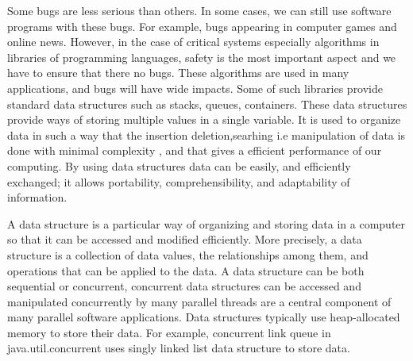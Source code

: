 Some bugs are less serious than others. In some cases, we can still use software programs with these bugs. For example, bugs appearing in computer games and online news. However, in the case of critical systems 
especially algorithms in libraries of programming languages, safety is the most important aspect and we have to ensure that there no bugs. These algorithms are used in many applications, and bugs will have wide impacts. Some of such libraries provide standard data structures such as stacks, queues, containers. These data structures provide ways of storing multiple values in a single variable. It is used to organize data in such a way that the insertion deletion,searhing i.e manipulation of data is done with minimal complexity , and that gives a efficient performance of our computing. By using data structures data can be easily, and efficiently exchanged; it allows portability, comprehensibility, and adaptability of information.

A data structure is a particular way of organizing and storing data in a computer so that it can be accessed and modified efficiently. More precisely, a data structure is a collection of data values, the relationships among them, and operations that can be applied to the data. 
A data structure can be both sequential or concurrent, concurrent data structures can be accessed and manipulated concurrently by many parallel threads are a central component of many parallel software applications. 
Data structures typically use heap-allocated memory to store their data. For example, concurrent link queue in java.util.concurrent uses singly linked list data structure to store data.   





